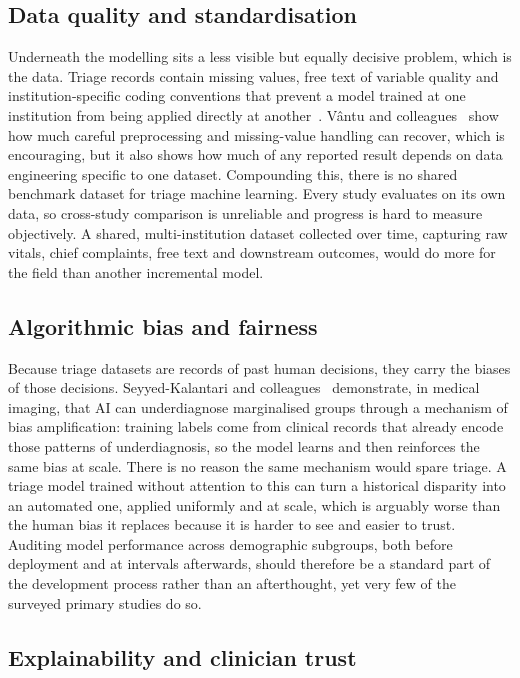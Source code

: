 \documentclass[11pt]{article}
\begin{document}
\subsection{Data quality and standardisation}

Underneath the modelling sits a less visible but equally decisive problem, which is the data. Triage records contain missing values, free text of variable quality and institution-specific coding conventions that prevent a model trained at one institution from being applied directly at another~\cite{Vantu2023, Wang2023}. Vântu and colleagues~\cite{Vantu2023} show how much careful preprocessing and missing-value handling can recover, which is encouraging, but it also shows how much of any reported result depends on data engineering specific to one dataset. Compounding this, there is no shared benchmark dataset for triage machine learning. Every study evaluates on its own data, so cross-study comparison is unreliable and progress is hard to measure objectively. A shared, multi-institution dataset collected over time, capturing raw vitals, chief complaints, free text and downstream outcomes, would do more for the field than another incremental model.

\subsection{Algorithmic bias and fairness}

Because triage datasets are records of past human decisions, they carry the biases of those decisions. Seyyed-Kalantari and colleagues~\cite{SeyyedKalantari2021} demonstrate, in medical imaging, that AI can underdiagnose marginalised groups through a mechanism of bias amplification: training labels come from clinical records that already encode those patterns of underdiagnosis, so the model learns and then reinforces the same bias at scale. There is no reason the same mechanism would spare triage. A triage model trained without attention to this can turn a historical disparity into an automated one, applied uniformly and at scale, which is arguably worse than the human bias it replaces because it is harder to see and easier to trust. Auditing model performance across demographic subgroups, both before deployment and at intervals afterwards, should therefore be a standard part of the development process rather than an afterthought, yet very few of the surveyed primary studies do so.

\subsection{Explainability and clinician trust}
\end{document}
